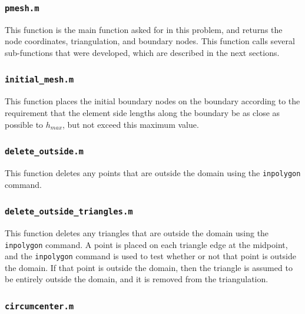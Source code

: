 \documentclass[10pt]{article}
\begin{document}
\subsubsection{{\tt pmesh.m}}

This function is the main function asked for in this problem, and returns the node coordinates, triangulation, and boundary nodes. This function calls several sub-functions that were developed, which are described in the next sections. 



\subsubsection{{\tt initial\_mesh.m}}

This function places the initial boundary nodes on the boundary according to the requirement that the element side lengths along the boundary be as close as possible to \(h_{max}\), but not exceed this maximum value.



\subsubsection{{\tt delete\_outside.m}}

This function deletes any points that are outside the domain using the {\tt inpolygon} command.



\subsubsection{{\tt delete\_outside\_triangles.m}}

This function deletes any triangles that are outside the domain using the {\tt inpolygon} command. A point is placed on each triangle edge at the midpoint, and the {\tt inpolygon} command is used to test whether or not that point is outside the domain. If that point is outside the domain, then the triangle is assumed to be entirely outside the domain, and it is removed from the triangulation.



\subsubsection{{\tt circumcenter.m}}
\end{document}
